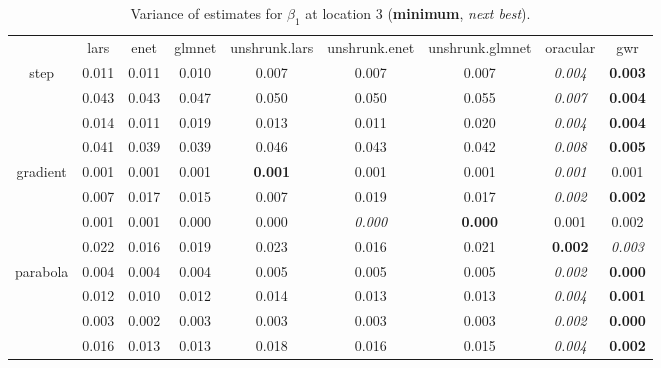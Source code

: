 \documentclass[authoryear, review, 11pt]{elsarticle}
\begin{document}
\begin{table}[ht]
\begin{center}
\begin{tabular}{ccccccccc}
  & lars & enet & glmnet & unshrunk.lars & unshrunk.enet & unshrunk.glmnet & oracular & gwr \\ 
  \cline{2-9}
  \multirow{4}{*}{step} & 0.011 & 0.011 & 0.010 & 0.007 & 0.007 & 0.007 & \emph{0.004} & \textbf{0.003} \\ 
  & 0.043 & 0.043 & 0.047 & 0.050 & 0.050 & 0.055 & \emph{0.007} & \textbf{0.004} \\ 
  & 0.014 & 0.011 & 0.019 & 0.013 & 0.011 & 0.020 & \emph{0.004} & \textbf{0.004} \\ 
  & 0.041 & 0.039 & 0.039 & 0.046 & 0.043 & 0.042 & \emph{0.008} & \textbf{0.005} \\ 
  \cline{2-9}
  \multirow{4}{*}{gradient} & 0.001 & 0.001 & 0.001 & \textbf{0.001} & 0.001 & 0.001 & \emph{0.001} & 0.001 \\ 
  & 0.007 & 0.017 & 0.015 & 0.007 & 0.019 & 0.017 & \emph{0.002} & \textbf{0.002} \\ 
  & 0.001 & 0.001 & 0.000 & 0.000 & \emph{0.000} & \textbf{0.000} & 0.001 & 0.002 \\ 
  & 0.022 & 0.016 & 0.019 & 0.023 & 0.016 & 0.021 & \textbf{0.002} & \emph{0.003} \\ 
  \cline{2-9}
  \multirow{4}{*}{parabola} & 0.004 & 0.004 & 0.004 & 0.005 & 0.005 & 0.005 & \emph{0.002} & \textbf{0.000} \\ 
  & 0.012 & 0.010 & 0.012 & 0.014 & 0.013 & 0.013 & \emph{0.004} & \textbf{0.001} \\ 
  & 0.003 & 0.002 & 0.003 & 0.003 & 0.003 & 0.003 & \emph{0.002} & \textbf{0.000} \\ 
  & 0.016 & 0.013 & 0.013 & 0.018 & 0.016 & 0.015 & \emph{0.004} & \textbf{0.002} \\ 
  \end{tabular}
\caption{Variance of estimates for $\beta_1$ at location 3 (\textbf{minimum}, \emph{next best}).\label{table:loc3-X1-varx}}
\end{center}
\end{table}
\end{document}
